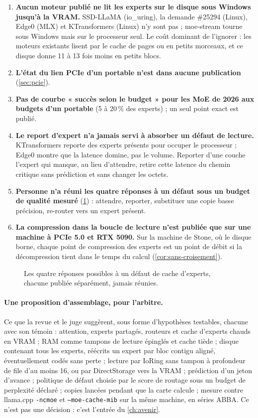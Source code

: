 \begin{enumerate}
\item \textbf{Aucun moteur publié ne lit les experts sur le disque sous Windows jusqu'à la VRAM.} SSD-LLaMA (io\_uring), la demande \#25294 (Linux), Edge0 (MLX) et KTransformers (Linux) n'y sont pas ; moe-stream tourne sous Windows mais sur le processeur seul. Le coût dominant de l'ignorer : les moteurs existants lisent par le cache de pages ou en petits morceaux, et ce disque donne 11 à 13 fois moins en petits blocs.
\item \textbf{L'état du lien PCIe d'un portable n'est dans aucune publication} (\cref{sec:pcie}).
\item \textbf{Pas de courbe « succès selon le budget » pour les MoE de 2026 aux budgets d'un portable} (5 à 20\,\% des experts) ; un seul point exact est publié.
\item \textbf{Le report d'expert n'a jamais servi à absorber un défaut de lecture.} KTransformers reporte des experts présents pour occuper le processeur ; Edge0 montre que la latence domine, pas le volume. Reporter d'une couche l'expert qui manque, au lieu d'attendre, retire cette latence du chemin critique sans prédiction et sans changer les octets.
\item \textbf{Personne n'a réuni les quatre réponses à un défaut sous un budget de qualité mesuré} (\cref{fig:defaut}) : attendre, reporter, substituer une copie basse précision, re-router vers un expert présent.
\item \textbf{La compression dans la boucle de lecture n'est publiée que sur une machine à PCIe 5.0 et RTX 5090.} Sur la machine de Stone, où le disque borne, chaque point de compression des experts est un point de débit si la décompression tient dans le temps du calcul (\cref{cor:sans-croisement}).
\end{enumerate}

\begin{figure}[ht]
\centering
\SchemaDefaut
\caption[Les quatre réponses à un défaut de cache]{Les quatre réponses possibles à un défaut de cache d'experts, chacune publiée séparément, jamais réunies.}
\label{fig:defaut}
\end{figure}

\paragraph{Une proposition d'assemblage, pour l'arbitre.} Ce que la revue et le juge suggèrent, sous forme d'hypothèses testables, chacune avec son témoin : attention, experts partagés, routeurs et cache d'experts chauds en VRAM ; RAM comme tampons de lecture épinglés et cache tiède ; disque contenant tous les experts, réécrits un expert par bloc contigu aligné, éventuellement codés sans perte ; lecture par IoRing sans tampon à profondeur de file d'au moins 16, ou par DirectStorage vers la VRAM ; prédiction d'un jeton d'avance ; politique de défaut choisie par le score de routage sous un budget de perplexité déclaré ; copies lancées pendant que la carte calcule ; mesure contre llama.cpp \texttt{-ncmoe} et \texttt{--moe-cache-mib} sur la même machine, en séries ABBA. Ce n'est pas une décision : c'est l'entrée du \cref{ch:avenir}.


